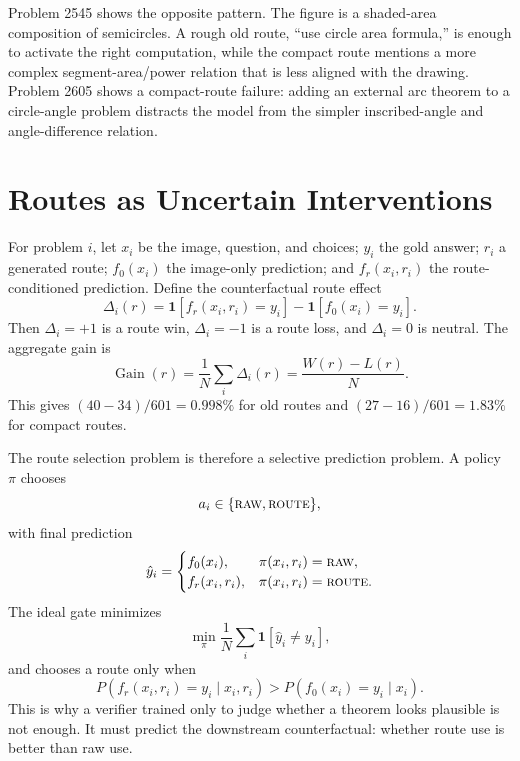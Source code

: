 \documentclass[11pt]{article}
\begin{document}
Problem 2545 shows the opposite pattern. The figure is a shaded-area composition of semicircles. A rough old route, ``use circle area formula,'' is enough to activate the right computation, while the compact route mentions a more complex segment-area/power relation that is less aligned with the drawing. Problem 2605 shows a compact-route failure: adding an external arc theorem to a circle-angle problem distracts the model from the simpler inscribed-angle and angle-difference relation.

\section{Routes as Uncertain Interventions}
For problem \(i\), let \(x_i\) be the image, question, and choices; \(y_i\) the gold answer; \(r_i\) a generated route; \(f_0(x_i)\) the image-only prediction; and \(f_r(x_i,r_i)\) the route-conditioned prediction. Define the counterfactual route effect
\begin{equation}
\Delta_i(r)=
\mathbf{1}[f_r(x_i,r_i)=y_i]
-
\mathbf{1}[f_0(x_i)=y_i].
\label{eq:route-effect-core}
\end{equation}
Then \(\Delta_i=+1\) is a route win, \(\Delta_i=-1\) is a route loss, and \(\Delta_i=0\) is neutral. The aggregate gain is
\begin{equation}
\operatorname{Gain}(r)
=
\frac{1}{N}\sum_i \Delta_i(r)
=
\frac{W(r)-L(r)}{N}.
\label{eq:gain-core}
\end{equation}
This gives \( (40-34)/601=0.998\% \) for old routes and \( (27-16)/601=1.83\% \) for compact routes.

The route selection problem is therefore a selective prediction problem. A policy \(\pi\) chooses
\[
a_i\in\{\textsc{raw},\textsc{route}\},
\]
with final prediction
\begin{equation}
\hat{y}_i =
\begin{cases}
f_0(x_i), & \pi(x_i,r_i)=\textsc{raw},\\
f_r(x_i,r_i), & \pi(x_i,r_i)=\textsc{route}.
\end{cases}
\end{equation}
The ideal gate minimizes
\begin{equation}
\min_{\pi}\frac{1}{N}\sum_i \mathbf{1}[\hat{y}_i\neq y_i],
\end{equation}
and chooses a route only when
\begin{equation}
P(f_r(x_i,r_i)=y_i\mid x_i,r_i)>
P(f_0(x_i)=y_i\mid x_i).
\label{eq:optimal-gate-core}
\end{equation}
This is why a verifier trained only to judge whether a theorem looks plausible is not enough. It must predict the downstream counterfactual: whether route use is better than raw use.
\end{document}

